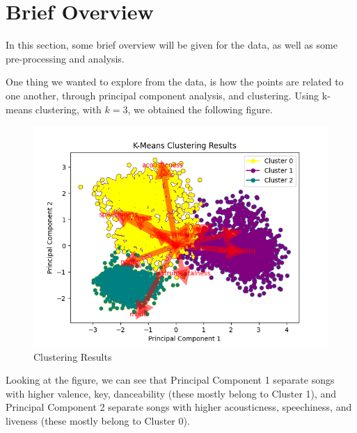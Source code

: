 \section{Brief Overview}

In this section, some brief overview will be given for the data, as well as some pre-processing and analysis.

One thing we wanted to explore from the data, is how the points are related to one another, through principal component analysis, and clustering. Using k-means clustering, with $k = 3$, we obtained the following figure.

\begin{figure}[H] %
    \centering
    \includegraphics[width=1\linewidth]{kmeanscluster.png}
    \caption{Clustering Results}
\end{figure}

Looking at the figure, we can see that Principal Component 1 separate songs with higher valence, key, danceability (these mostly belong to Cluster 1), and Principal Component 2 separate songs with higher acousticness, speechiness, and liveness (these mostly belong to Cluster 0).